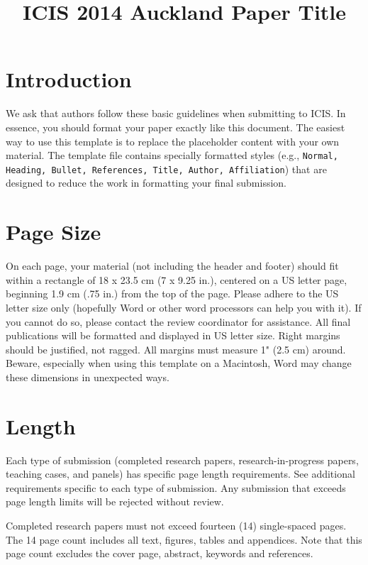 \documentclass{icis}
\title{ICIS 2014 Auckland Paper Title}
\begin{document}
\maketitle

\section{Introduction}

We ask that authors follow these basic guidelines when submitting to ICIS. In
essence, you should format your paper exactly like this document. The easiest
way to use this template is to replace the placeholder content with your own
material. The template file contains specially formatted styles (e.g.,
\texttt{Normal, Heading, Bullet, References, Title, Author, Affiliation}) that
are designed to reduce the work in formatting your final submission.

\section{Page Size}
On each page, your material (not including the header and footer) should fit
within a rectangle of 18 x 23.5 cm (7 x 9.25 in.), centered on a US letter page,
beginning 1.9 cm (.75 in.) from the top of the page.  Please adhere to the US
letter size only (hopefully Word or other word processors can help you with
it). If you cannot do so, please contact the review coordinator for
assistance. All final publications will be formatted and displayed in US letter
size. Right margins should be justified, not ragged. All margins must measure 1"
(2.5 cm) around. Beware, especially when using this template on a Macintosh,
Word may change these dimensions in unexpected ways.

\section{Length}
Each type of submission (completed research papers, research-in-progress papers,
teaching cases, and panels) has specific page length requirements. See
additional requirements specific to each type of submission. Any submission that
exceeds page length limits will be rejected without review.

Completed research papers must not exceed fourteen (14) single-spaced pages. The
14 page count includes all text, figures, tables and appendices. Note that this
page count excludes the cover page, abstract, keywords and references. 
\end{document}
